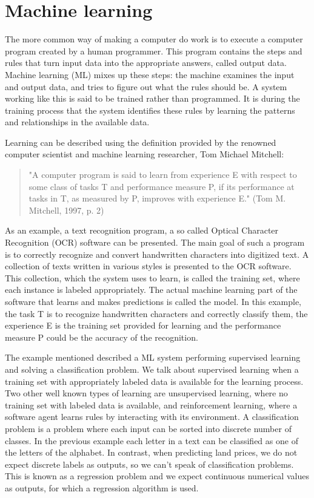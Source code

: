 \documentclass[a4paper,oneside,onecolumn,12pt]{book}
\begin{document}
\section{Machine learning}
The more common way of making a computer do work is to execute a computer program created by a human programmer. This program contains the steps and rules that turn input data into the appropriate answers, called output data. Machine learning (ML) mixes up these steps: the machine examines the input and output data, and tries to figure out what the rules should be. A system working like this is said to be trained rather than programmed. It is during the training process that the system identifies these rules by learning the patterns and relationships in the available data. \cite{DLP}

Learning can be described using the definition provided by the renowned computer scientist and machine learning researcher, Tom Michael Mitchell:
\begin{quote}
	"A computer program is said to learn from experience E with respect to some class of tasks T and performance measure P, if its performance at tasks in T, as measured by P, improves with experience E." (Tom M. Mitchell, 1997, p. 2)\cite{ML}
\end{quote}
As an example, a text recognition program, a so called Optical Character Recognition (OCR) software can be presented. The main goal of such a program is to correctly recognize and convert handwritten characters into digitized text. A collection of texts written in various styles is presented to the OCR software. This collection, which the system uses to learn, is called the training set, where each instance is labeled appropriately. The actual machine learning part of the software that learns and makes predictions is called the model. In this example, the task T is to recognize handwritten characters and correctly classify them, the experience E is the training set provided for learning and the performance measure P could be the accuracy of the recognition.

The example mentioned described a ML system performing supervised learning and solving a classification problem. We talk about supervised learning when a training set with appropriately labeled data is available for the learning process. Two other well known types of learning are unsupervised learning, where no training set with labeled data is available, and reinforcement learning, where a software agent learns rules by interacting with its environment. A classification problem is a problem where each input can be sorted into discrete number of classes. In the previous example each letter in a text can be classified as one of the letters of the alphabet. In contrast, when predicting land prices, we do not expect discrete labels as outputs, so we can't speak of classification problems. This is known as a regression problem and we expect continuous numerical values as outputs, for which a regression algorithm is used. \cite{AISL}
\end{document}
